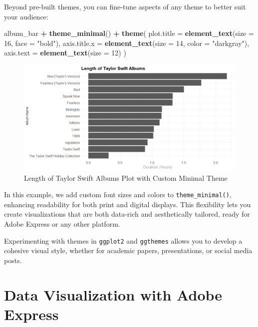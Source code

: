 \documentclass[
]{book}
\newenvironment{Shaded}{\begin{snugshade}}{\end{snugshade}}
\newcommand{\AttributeTok}[1]{\textcolor[rgb]{0.13,0.29,0.53}{#1}}
\newcommand{\DecValTok}[1]{\textcolor[rgb]{0.00,0.00,0.81}{#1}}
\newcommand{\FunctionTok}[1]{\textcolor[rgb]{0.13,0.29,0.53}{\textbf{#1}}}
\newcommand{\NormalTok}[1]{#1}
\newcommand{\SpecialCharTok}[1]{\textcolor[rgb]{0.81,0.36,0.00}{\textbf{#1}}}
\newcommand{\StringTok}[1]{\textcolor[rgb]{0.31,0.60,0.02}{#1}}
\begin{document}
Beyond pre-built themes, you can fine-tune aspects of any theme to better suit your audience:

\begin{Shaded}
\begin{Highlighting}[]
\NormalTok{album\_bar }\SpecialCharTok{+} 
  \FunctionTok{theme\_minimal}\NormalTok{() }\SpecialCharTok{+}
  \FunctionTok{theme}\NormalTok{(}
    \AttributeTok{plot.title =} \FunctionTok{element\_text}\NormalTok{(}\AttributeTok{size =} \DecValTok{16}\NormalTok{, }\AttributeTok{face =} \StringTok{"bold"}\NormalTok{),}
    \AttributeTok{axis.title.x =} \FunctionTok{element\_text}\NormalTok{(}\AttributeTok{size =} \DecValTok{14}\NormalTok{, }\AttributeTok{color =} \StringTok{"darkgray"}\NormalTok{),}
    \AttributeTok{axis.text =} \FunctionTok{element\_text}\NormalTok{(}\AttributeTok{size =} \DecValTok{12}\NormalTok{)}
\NormalTok{  )}
\end{Highlighting}
\end{Shaded}

\begin{figure}
\centering
\includegraphics[width=1\textwidth,height=\textheight]{images/taylor_custom.png}
\caption{Length of Taylor Swift Albums Plot with Custom Minimal Theme}
\end{figure}

In this example, we add custom font sizes and colors to \texttt{theme\_minimal()}, enhancing readability for both print and digital displays. This flexibility lets you create visualizations that are both data-rich and aesthetically tailored, ready for Adobe Express or any other platform.

Experimenting with themes in \texttt{ggplot2} and \texttt{ggthemes} allows you to develop a cohesive visual style, whether for academic papers, presentations, or social media posts.

\section{Data Visualization with Adobe Express}\label{data-visualization-with-adobe-express}
\end{document}
